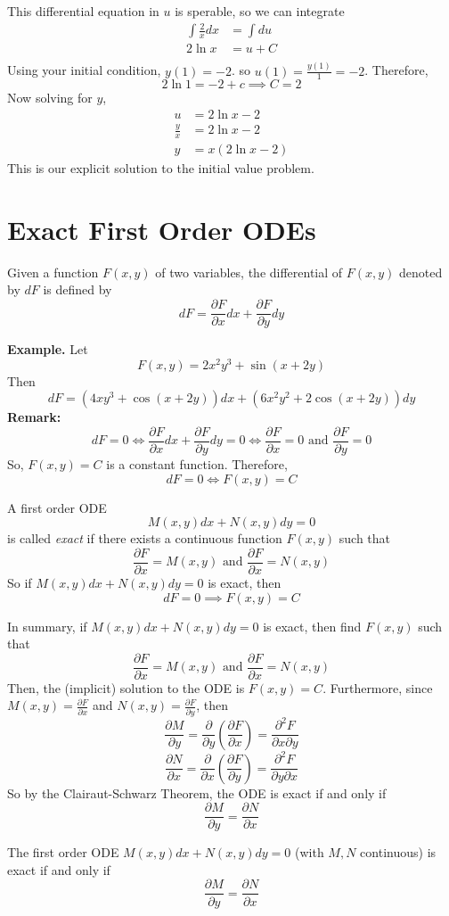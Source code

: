 \documentclass[openany]{report}
\begin{document}
This differential equation in $u$ is sperable, so we can integrate 
\begin{align*}
    \int \frac{2}{x}dx &= \int du\\
    2\ln x &= u + C\\
\end{align*}
Using your initial condition, $y(1) = -2$. so $u(1) = \frac{y(1)}{1} = -2$. Therefore,
\[2\ln 1 = -2 + c \implies C = 2\]
Now solving for $y$, 
\begin{align*}
    u &= 2\ln x - 2\\
    \frac{y}{x} &= 2\ln x - 2\\
    y &= x(2\ln x - 2)
\end{align*}
This is our explicit solution to the initial value problem. 
\section{Exact First Order ODEs}
\begin{definition}
    Given a function $F(x,y)$ of two variables, the differential of $F(x,y)$ denoted by $dF$ is defined by 
    \[dF = \frac{\partial F}{\partial x} dx + \frac{\partial F}{\partial y}dy\]
\end{definition}
\noindent
\textbf{Example.} Let 
\[F(x,y) = 2x^2y^3 + \sin(x+2y)\]
Then 
\[dF = (4xy^3 + \cos(x+2y))dx + (6x^2y^2 + 2\cos(x+2y))dy\]
\textbf{Remark:}
\[dF = 0 \iff \frac{\partial F}{\partial x} dx + \frac{\partial F}{\partial y} dy = 0 \iff \frac{\partial F}{\partial x} = 0 \text{ and } \frac{\partial F}{\partial y} = 0 \]
So, $F(x,y) = C$ is a constant function. Therefore, 
\[dF = 0 \iff F(x,y) = C\]
\begin{definition}
    A first order ODE 
    \[M(x,y)dx + N(x,y)dy = 0\]
    is called \emph{exact} if there exists a continuous function $F(x,y)$ such that 
    \[\frac{\partial F}{\partial x} = M(x,y) \text{ and } \frac{\partial F}{\partial x} = N(x,y)\]
    So if $M(x,y)dx + N(x,y)dy = 0$ is exact, then 
    \[dF = 0 \implies F(x,y) = C\]
\end{definition}
In summary, if $M(x,y)dx + N(x,y)dy = 0$ is exact, then find $F(x,y)$ such that
\[\frac{\partial F}{\partial x} = M(x,y) \text{ and } \frac{\partial F}{\partial x} = N(x,y)\]
Then, the (implicit) solution to the ODE is $F(x,y) = C$. Furthermore, since $M(x,y) = \frac{\partial F}{\partial x}$ and $N(x,y) = \frac{\partial F}{\partial y}$, then 
\[\frac{\partial M}{\partial y} = \frac{\partial}{\partial y} \left(\frac{\partial F}{\partial x}\right) = \frac{\partial^2F}{\partial x \partial y}\]
\[\frac{\partial N}{\partial x} = \frac{\partial}{\partial x} \left(\frac{\partial F}{\partial y}\right) = \frac{\partial^2F}{\partial y \partial x}\]
So by the Clairaut-Schwarz Theorem, the ODE is exact if and only if
\[\frac{\partial M}{\partial y} = \frac{\partial N}{\partial x}\]
\begin{theorem}
    The first order ODE $M(x,y)dx + N(x,y)dy = 0$ (with $M,N$ continuous) is exact if and only if
    \[\frac{\partial M}{\partial y} = \frac{\partial N}{\partial x}\]
\end{theorem}
\end{document}
